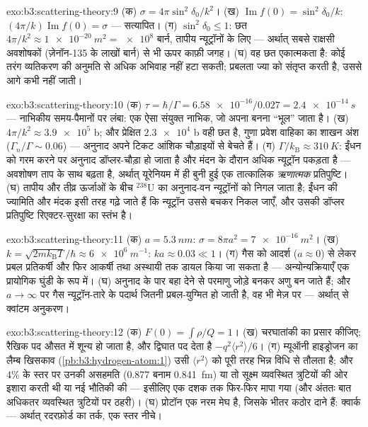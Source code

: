 \begin{solution}{exo:b3:scattering-theory:9}
(क) $\sigma = 4\pi\sin^2\delta_0/k^2$। (ख) $\operatorname{Im}f(0)
= \sin^2\delta_0/k$: $(4\pi/k)\operatorname{Im}f(0) = \sigma$ ---
सत्यापित। (ग) $\sin^2\delta_0 \le 1$: छत $4\pi/k^2 \approx
\qty{1e-20}{m^2} = \num{e8}$ बार्न, तापीय न्यूट्रॉनों के लिए ---
अर्थात् सबसे राक्षसी अवशोषकों (ज़ेनॉन-135 के लाखों बार्न) से भी ऊपर
काफ़ी जगह। (घ) वह छत एकात्मकता है: कोई तरंग व्यतिकरण की अनुमति से
अधिक अभिवाह नहीं हटा सकती; प्रबलता ज्या को संतृप्त करती है, उससे आगे
कभी नहीं जाती।
\end{solution}

\begin{solution}{exo:b3:scattering-theory:10}
(क) $\tau = \hbar/\Gamma = \num{6.58e-16}/0.027 =
\qty{2.4e-14}{s}$ --- नाभिकीय समय-पैमानों पर लंबा: एक ऐसा संयुक्त
नाभिक, जो अपना बनना ``भूल'' जाता है। (ख) $4\pi/k^2 \approx
\num{3.9e5}$ b; और प्रेक्षित $\num{2.3e4}$ b वही छत है, गुणा प्रवेश
वाहिका का शाखन अंश ($\Gamma_n/\Gamma
\sim 0.06$) --- अनुनाद अपने टिकट आंशिक चौड़ाइयों से बेचते हैं। (ग)
$\Gamma/k_{\text{B}} \approx \qty{310}{K}$: ईंधन को गरम करने पर
अनुनाद डॉप्लर-चौड़ा हो जाता है और मंदन के दौरान अधिक न्यूट्रॉन पकड़ता
है --- अवशोषण ताप के साथ बढ़ता है, अर्थात् यूरेनियम में ही बुनी हुई
एक तात्कालिक \emph{ऋणात्मक} प्रतिपुष्टि। (घ) तापीय और तीव्र
ऊर्जाओं के बीच $^{238}$U का अनुनाद-वन न्यूट्रॉनों को निगल जाता है;
ईंधन की ज्यामिति और मंदक इसी तरह गढ़े जाते हैं कि न्यूट्रॉन उससे
बचकर निकल जाएँ, और उसकी डॉप्लर प्रतिपुष्टि रिएक्टर-सुरक्षा का स्तंभ
है।
\end{solution}

\begin{solution}{exo:b3:scattering-theory:11}
(क) $a = \qty{5.3}{nm}$: $\sigma = 8\pi a^2 = \qty{7e-16}{m^2}$।
(ख) $k = \sqrt{2mk_{\text{B}}T}/\hbar \approx \qty{6e6}{m^{-1}}$:
$ka \approx 0.03 \ll 1$। (ग) गैस को आदर्श
($a \approx 0$) से लेकर प्रबल प्रतिकर्षी और फिर आकर्षी तथा अस्थायी
तक डायल किया जा सकता है --- अन्योन्यक्रियाएँ एक प्रायोगिक घुंडी के
रूप में। (घ) अनुनाद के पार बहा देने से परमाणु जोड़े बनकर अणु बन जाते
हैं; और $a \to
\infty$ पर गैस न्यूट्रॉन-तारे के पदार्थ जितनी प्रबल-युग्मित हो जाती
है, वह भी मेज़ पर --- अर्थात्  से क्वांटम
अनुकरण।
\end{solution}

\begin{solution}{exo:b3:scattering-theory:12}
(क) $F(0) = \int\rho/Q = 1$। (ख) चरघातांकी का प्रसार कीजिए; रैखिक
पद औसत में शून्य हो जाता है, और द्विघात पद देता है
$-q^2\langle r^2\rangle/6$। (ग) म्यूऑनी हाइड्रोजन का लैम्ब खिसकाव
(\cref{pb:b3:hydrogen-atom:1}) उसी
$\langle r^2\rangle$ को पूरी तरह भिन्न विधि से तौलता है; और $4\%$
के स्तर पर उनकी असहमति (0.877 बनाम \qty{0.841}{fm})
या तो सूक्ष्म व्यवस्थित त्रुटियों की ओर इशारा करती थी या नई भौतिकी
की --- इसीलिए एक दशक तक फिर-फिर मापा गया (और अंततः बात
अधिकतर व्यवस्थित त्रुटियों पर ठहरी)।
(घ) प्रोटॉन एक नरम मेघ है, जिसके भीतर कठोर दाने हैं: क्वार्क
--- अर्थात् रदरफ़ोर्ड का तर्क, एक स्तर नीचे।
\end{solution}

